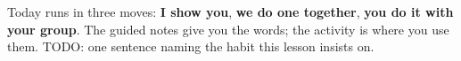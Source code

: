 \documentclass[12pt]{article}
\begin{document}
\vspace{0.10in}

\begin{remindbox}
\small Today runs in three moves: \textbf{I show you}, \textbf{we do one together},
\textbf{you do it with your group}. The guided notes give you the words; the activity is where
you use them. TODO: one sentence naming the habit this lesson insists on.
\end{remindbox}
\end{document}
